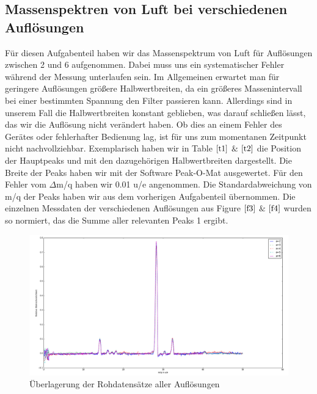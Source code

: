 \documentclass[10pt,a4paper]{article}
\begin{document}
\subsection{Massenspektren von Luft bei verschiedenen Auflösungen}

Für diesen Aufgabenteil haben wir das Massenspektrum von Luft für Auflösungen zwischen 2 und 6 aufgenommen. Dabei muss uns ein systematischer Fehler während der Messung unterlaufen sein. Im Allgemeinen erwartet man für geringere Auflösungen größere Halbwertbreiten, da ein größeres Massenintervall bei einer bestimmten Spannung den Filter passieren kann. Allerdings sind in unserem Fall die Halbwertbreiten konstant geblieben, was darauf schließen lässt, das wir die Auflösung nicht verändert haben. Ob dies an einem Fehler des Gerätes oder fehlerhafter Bedienung lag, ist für uns zum momentanen Zeitpunkt nicht nachvollziehbar. Exemplarisch haben wir in Table $\ref{t1}$  $\&$ $\ref{t2}$  die Position der Hauptpeaks und mit den dazugehörigen Halbwertbreiten dargestellt. Die Breite der Peaks haben wir mit der Software Peak-O-Mat ausgewertet. Für den Fehler vom $\Delta$m/q haben wir 0.01 u/e angenommen. Die Standardabweichung von m/q der Peaks haben wir aus dem vorherigen Aufgabenteil übernommen. Die einzelnen Messdaten der verschiedenen Auflösungen aus Figure $\ref{f3}$  $\&$ $\ref{f4}$ wurden so normiert, das die Summe aller relevanten Peaks 1 ergibt.
\begin{figure}[h]
	\includegraphics[scale = 0.5]{alleres.png}
	\centering
	\caption{Überlagerung der Rohdatensätze aller Auflösungen}
	\label{f3}
\end{figure}
\end{document}
